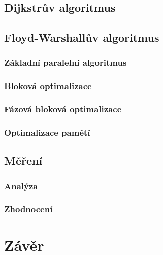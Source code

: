 \subsection{Dijkstrův algoritmus}

\subsection{Floyd-Warshallův algoritmus}
\subsubsection{Základní paralelní algoritmus}
\subsubsection{Bloková optimalizace}
\subsubsection{Fázová bloková optimalizace}
\subsubsection{Optimalizace pamětí}

\subsection{Měření}
\subsubsection{Analýza}
\subsubsection{Zhodnocení}


\section{Závěr}




\clearpage





